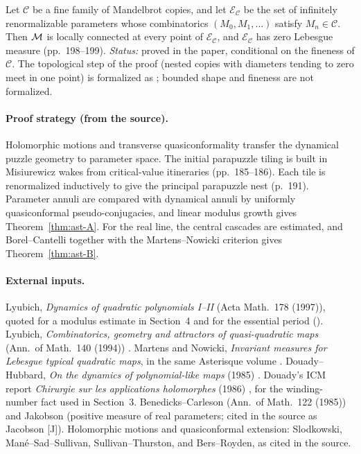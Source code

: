 \begin{proposition}
\label{prop:ast-fine}
Let $\mathcal C$ be a fine family of Mandelbrot copies, and let $\mathcal E_{\mathcal C}$ be the set of infinitely renormalizable
parameters whose combinatorics $(M_0,M_1,\dots)$ satisfy $M_n\in\mathcal C$.  Then $\mathcal M$ is locally connected at every point of
$\mathcal E_{\mathcal C}$, and $\mathcal E_{\mathcal C}$ has zero Lebesgue measure (pp.~198--199).
\emph{Status:} proved in the paper, conditional on the fineness of $\mathcal C$.  The topological step of the proof (nested copies with diameters tending to zero meet in one point) is formalized as ; bounded shape and fineness are not formalized.
\end{proposition}

\paragraph{Proof strategy (from the source).}
Holomorphic motions and transverse quasiconformality transfer the dynamical puzzle geometry to parameter space.  The initial
parapuzzle tiling is built in Misiurewicz wakes from critical-value itineraries (pp.~185--186).  Each tile is renormalized
inductively to give the principal parapuzzle nest (p.~191).  Parameter annuli are compared with dynamical annuli by uniformly
quasiconformal pseudo-conjugacies, and linear modulus growth gives Theorem~\ref{thm:ast-A}.  For the real line, the central
cascades are estimated, and Borel--Cantelli together with the Martens--Nowicki criterion gives Theorem~\ref{thm:ast-B}.

\paragraph{External inputs.}
Lyubich, \emph{Dynamics of quadratic polynomials I--II} (Acta Math.\ 178 (1997)), quoted for a modulus estimate in
Section~4 and for the essential period (\cite{LyubichDynamics}).  Lyubich, \emph{Combinatorics, geometry and attractors of quasi-quadratic maps}
(Ann.\ of Math.\ 140 (1994)) \cite{LyubichQuasiQuadratic}.  Martens and Nowicki, \emph{Invariant measures for Lebesgue typical
quadratic maps}, in the same Asterisque volume \cite{MartensNowicki}.  Douady--Hubbard, \emph{On the dynamics of polynomial-like maps}
(1985) \cite{DHPolynomialLike}.  Douady's ICM report \emph{Chirurgie sur les applications holomorphes} (1986) \cite{DouadyICM}, for the
winding-number fact used in Section~3.  Benedicks--Carleson (Ann.\ of Math.\ 122 (1985)) \cite{BenedicksCarleson} and Jakobson
(positive measure of real parameters; cited in the source as Jacobson [J]).  Holomorphic motions and quasiconformal extension:
Slodkowski, Man\'e--Sad--Sullivan, Sullivan--Thurston, and Bers--Royden, as cited in the source.

